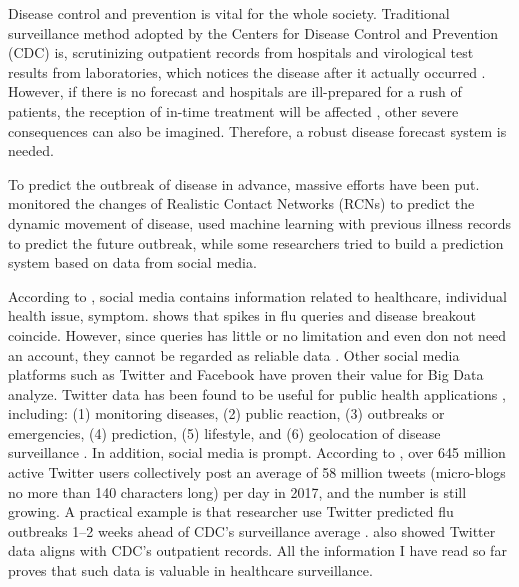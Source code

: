Disease control and prevention is vital for the whole society. Traditional surveillance method adopted by the Centers for Disease Control and Prevention (CDC) is, scrutinizing outpatient records from hospitals and virological test results from laboratories, which notices the disease after it actually occurred \cite{schmidt2012trending}. However, if there is no forecast and hospitals are ill-prepared for a rush of patients, the reception of in-time treatment will be affected \cite{elkin2017network}, other severe consequences can also be imagined. Therefore, a robust disease forecast system is needed.

To predict the outbreak of disease in advance, massive efforts have been put. \cite{chen2017reality} monitored the changes of Realistic Contact Networks (RCNs) to predict the dynamic movement of disease, \cite{chen2017disease} used machine learning with previous illness records to predict the future outbreak, while some researchers tried to build a prediction system based on data from social media. 

According to \cite{lee2013real}, social media contains information related to healthcare, individual health issue, symptom. \cite{ginsberg2009detecting} shows that spikes in flu queries and disease breakout coincide. However, since queries has little or no limitation and even don not need an account, they cannot be regarded as reliable data \cite{schmidt2012trending}. Other social media platforms such as Twitter and Facebook have proven their value for Big Data analyze. Twitter data has been found to be useful for public health applications \cite{denecke2009valuable}, including: (1) monitoring diseases, (2) public reaction, (3) outbreaks or emergencies, (4) prediction, (5) lifestyle, and (6) geolocation of disease surveillance \cite{andreu2015big}. In addition, social media is prompt. According to \cite{elkin2017network}, over 645 million active Twitter users collectively post an average of 58 million tweets (micro-blogs no more than 140 characters long) per day in 2017, and the number is still growing. A practical example is that researcher use Twitter predicted flu outbreaks 1–2 weeks ahead of CDC’s surveillance average \cite{signorini2011use}. \cite{elkin2017network} also showed Twitter data aligns with CDC’s outpatient records. All the information I have read so far proves that such data is valuable in healthcare surveillance.  

